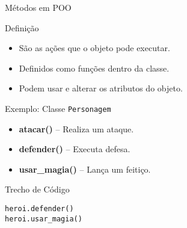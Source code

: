 \begin{frame}[fragile]{Métodos em POO}

    \begin{block}{Definição}
        \begin{itemize}
            \item São as ações que o objeto pode executar.
            \item Definidos como funções dentro da classe.
            \item Podem usar e alterar os atributos do objeto.
        \end{itemize}
    \end{block}

    \begin{exampleblock}{Exemplo: Classe \texttt{Personagem}}
        \begin{itemize}
            \item \textbf{atacar()} – Realiza um ataque.
            \item \textbf{defender()} – Executa defesa.
            \item \textbf{usar\_magia()} – Lança um feitiço.
        \end{itemize}
    \end{exampleblock}

    \begin{exampleblock}{Trecho de Código}
        \begin{verbatim}
heroi.defender()
heroi.usar_magia()
\end{verbatim}
    \end{exampleblock}

\end{frame}

